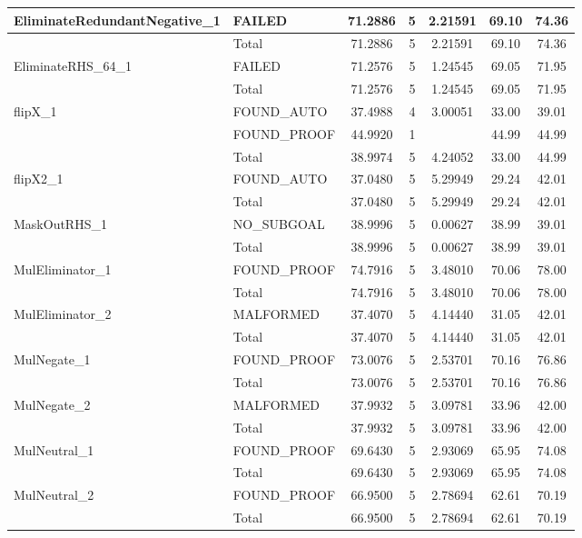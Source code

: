 \begin{appendices}
\begin{longtable}{L{0.25\textwidth} L{0.2\textwidth}  c  c  c  c  c }
    EliminateRedundantNegative\_1 & FAILED & 71.2886 & 5 & 2.21591 & 69.10 & 74.36 \\ \midrule 
    & Total & 71.2886 & 5 & 2.21591 & 69.10 & 74.36 \\ \midrule 
    EliminateRHS\_64\_1 & FAILED & 71.2576 & 5 & 1.24545 & 69.05 & 71.95 \\ \midrule 
    & Total & 71.2576 & 5 & 1.24545 & 69.05 & 71.95 \\ \midrule 
    flipX\_1 & FOUND\_AUTO & 37.4988 & 4 & 3.00051 & 33.00 & 39.01 \\ \midrule 
    & FOUND\_PROOF & 44.9920 & 1 &  & 44.99 & 44.99 \\ \midrule 
    & Total & 38.9974 & 5 & 4.24052 & 33.00 & 44.99 \\ \midrule 
    flipX2\_1 & FOUND\_AUTO & 37.0480 & 5 & 5.29949 & 29.24 & 42.01 \\ \midrule 
    & Total & 37.0480 & 5 & 5.29949 & 29.24 & 42.01 \\ \midrule 
    MaskOutRHS\_1 & NO\_SUBGOAL & 38.9996 & 5 & 0.00627 & 38.99 & 39.01 \\ \midrule 
    & Total & 38.9996 & 5 & 0.00627 & 38.99 & 39.01 \\ \midrule 
    MulEliminator\_1 & FOUND\_PROOF & 74.7916 & 5 & 3.48010 & 70.06 & 78.00 \\ \midrule 
    & Total & 74.7916 & 5 & 3.48010 & 70.06 & 78.00 \\ \midrule 
    MulEliminator\_2 & MALFORMED & 37.4070 & 5 & 4.14440 & 31.05 & 42.01 \\ \midrule 
    & Total & 37.4070 & 5 & 4.14440 & 31.05 & 42.01 \\ \midrule 
    MulNegate\_1 & FOUND\_PROOF & 73.0076 & 5 & 2.53701 & 70.16 & 76.86 \\ \midrule 
    & Total & 73.0076 & 5 & 2.53701 & 70.16 & 76.86 \\ \midrule 
    MulNegate\_2 & MALFORMED & 37.9932 & 5 & 3.09781 & 33.96 & 42.00 \\ \midrule 
    & Total & 37.9932 & 5 & 3.09781 & 33.96 & 42.00 \\ \midrule 
    MulNeutral\_1 & FOUND\_PROOF & 69.6430 & 5 & 2.93069 & 65.95 & 74.08 \\ \midrule 
    & Total & 69.6430 & 5 & 2.93069 & 65.95 & 74.08 \\ \midrule 
    MulNeutral\_2 & FOUND\_PROOF & 66.9500 & 5 & 2.78694 & 62.61 & 70.19 \\ \midrule 
    & Total & 66.9500 & 5 & 2.78694 & 62.61 & 70.19 \\ \midrule 

\end{longtable}
\end{appendices}
